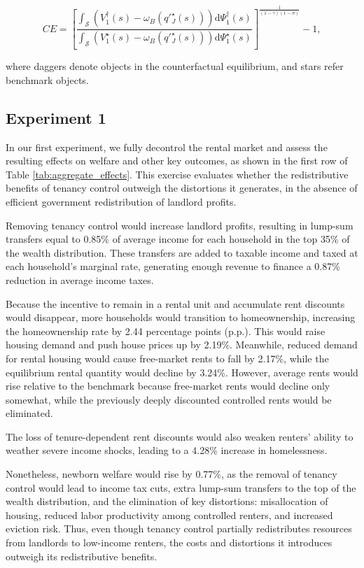 \documentclass[parskip=full]{article}
\begin{document}
\begin{equation}
  CE = \left[\frac{\int_{\mathcal{S}}\left(V^{\dagger}_{1}(s)-\omega_{B}\left(q'^{\star}_{J}(s)\right)\right)\mathrm{d}\Psi^{\dagger}_{1}(s)}{\int_{\mathcal{S}}\left(V^{\star}_{1}(s)-\omega_{B}\left(q'^{\star}_{J}(s)\right)\right)\mathrm{d}\Psi^{\star}_{1}(s)}\right]^{\frac{1}{(1-\gamma)(1-\sigma)}}-1,
\end{equation}

\noindent where daggers denote objects in the counterfactual equilibrium, and stars refer benchmark objects. 

\subsection{Experiment 1}\label{sec:exp_1}

In our first experiment, we fully decontrol the rental market and assess the resulting effects on welfare and other key outcomes, as shown in the first row of Table \ref{tab:aggregate_effects}. This exercise evaluates whether the redistributive benefits of tenancy control outweigh the distortions it generates, in the absence of efficient government redistribution of landlord profits.

Removing tenancy control would increase landlord profits, resulting in lump-sum transfers equal to 0.85\% of average income for each household in the top 35\% of the wealth distribution. These transfers are added to taxable income and taxed at each household’s marginal rate, generating enough revenue to finance a 0.87\% reduction in average income taxes.

Because the incentive to remain in a rental unit and accumulate rent discounts would disappear, more households would transition to homeownership, increasing the homeownership rate by 2.44 percentage points (p.p.). This would raise housing demand and push house prices up by 2.19\%. Meanwhile, reduced demand for rental housing would cause free-market rents to fall by 2.17\%, while the equilibrium rental quantity would decline by 3.24\%. However, average rents would rise relative to the benchmark because free-market rents would decline only somewhat, while the previously deeply discounted controlled rents would be eliminated.

The loss of tenure-dependent rent discounts would also weaken renters’ ability to weather severe income shocks, leading to a 4.28\% increase in homelessness.

Nonetheless, newborn welfare would rise by 0.77\%, as the removal of tenancy control would lead to income tax cuts, extra lump-sum transfers to the top of the wealth distribution, and the elimination of key distortions: misallocation of housing, reduced labor productivity among controlled renters, and increased eviction risk. Thus, even though tenancy control partially redistributes resources from landlords to low-income renters, the costs and distortions it introduces outweigh its redistributive benefits.
\end{document}
